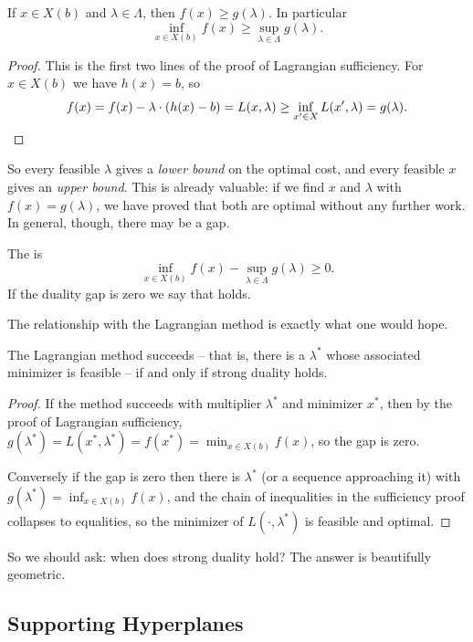 \documentclass[a4paper]{scrartcl}
\begin{document}
\begin{theorem}
    If $x \in X(b)$ and $\lambda \in \Lambda$, then $f(x) \geq g(\lambda)$. In particular
    $$
    \inf_{x \in X(b)}f(x) \geq \sup_{\lambda \in \Lambda}g(\lambda).
    $$
\end{theorem}
\begin{proof}
    This is the first two lines of the proof of Lagrangian sufficiency. For $x \in X(b)$ we have $h(x) = b$, so
    $$
    f(x) = f(x) - \lambda\cdot(h(x) - b) = L(x, \lambda) \geq \inf_{x' \in X}L(x', \lambda) = g(\lambda). \qedhere
    $$
\end{proof}

So every feasible $\lambda$ gives a \emph{lower bound} on the optimal cost, and every feasible $x$ gives an \emph{upper bound}. This is already valuable: if we find $x$ and $\lambda$ with $f(x) = g(\lambda)$, we have proved that both are optimal without any further work. In general, though, there may be a gap.

\begin{definition}
    The  is
    $$
    \inf_{x \in X(b)}f(x) - \sup_{\lambda \in \Lambda}g(\lambda) \geq 0.
    $$
    If the duality gap is zero we say that  holds.
\end{definition}

The relationship with the Lagrangian method is exactly what one would hope.

\begin{proposition}
    The Lagrangian method succeeds -- that is, there is a $\lambda^*$ whose associated minimizer is feasible -- if and only if strong duality holds.
\end{proposition}
\begin{proof}
    If the method succeeds with multiplier $\lambda^*$ and minimizer $x^*$, then by the proof of Lagrangian sufficiency, $g(\lambda^*) = L(x^*, \lambda^*) = f(x^*) = \min_{x \in X(b)}f(x)$, so the gap is zero.

    Conversely if the gap is zero then there is $\lambda^*$ (or a sequence approaching it) with $g(\lambda^*) = \inf_{x \in X(b)}f(x)$, and the chain of inequalities in the sufficiency proof collapses to equalities, so the minimizer of $L(\cdot, \lambda^*)$ is feasible and optimal.
\end{proof}

So we should ask: when does strong duality hold? The answer is beautifully geometric.

\subsection{Supporting Hyperplanes}
\end{document}

